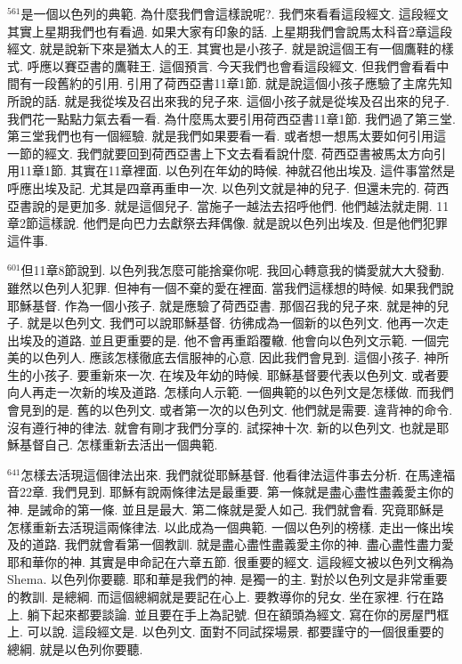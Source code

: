 \documentclass{book}
\begin{document}
$^{561}$是一個以色列的典範.
為什麼我們會這樣說呢?.
我們來看看這段經文.
這段經文其實上星期我們也有看過.
如果大家有印象的話.
上星期我們會說馬太科音2章這段經文.
就是說新下來是猶太人的王.
其實也是小孩子.
就是說這個王有一個鷹鞋的樣式.
呼應以賽亞書的鷹鞋王.
這個預言.
今天我們也會看這段經文.
但我們會看看中間有一段舊約的引用.
引用了荷西亞書11章1節.
就是說這個小孩子應驗了主席先知所說的話.
就是我從埃及召出來我的兒子來.
這個小孩子就是從埃及召出來的兒子.
我們花一點點力氣去看一看.
為什麼馬太要引用荷西亞書11章1節.
我們過了第三堂.
第三堂我們也有一個經驗.
就是我們如果要看一看.
或者想一想馬太要如何引用這一節的經文.
我們就要回到荷西亞書上下文去看看說什麼.
荷西亞書被馬太方向引用11章1節.
其實在11章裡面.
以色列在年幼的時候.
神就召他出埃及.
這件事當然是呼應出埃及記.
尤其是四章再重申一次.
以色列文就是神的兒子.
但還未完的.
荷西亞書說的是更加多.
就是這個兒子.
當施子一越法去招呼他們.
他們越法就走開.
11章2節這樣說.
他們是向巴力去獻祭去拜偶像.
就是說以色列出埃及.
但是他們犯罪這件事.

$^{601}$但11章8節說到.
以色列我怎麼可能捨棄你呢.
我回心轉意我的憐愛就大大發動.
雖然以色列人犯罪.
但神有一個不棄的愛在裡面.
當我們這樣想的時候.
如果我們說耶穌基督.
作為一個小孩子.
就是應驗了荷西亞書.
那個召我的兒子來.
就是神的兒子.
就是以色列文.
我們可以說耶穌基督.
彷彿成為一個新的以色列文.
他再一次走出埃及的道路.
並且更重要的是.
他不會再重蹈覆轍.
他會向以色列文示範.
一個完美的以色列人.
應該怎樣徹底去信服神的心意.
因此我們會見到.
這個小孩子.
神所生的小孩子.
要重新來一次.
在埃及年幼的時候.
耶穌基督要代表以色列文.
或者要向人再走一次新的埃及道路.
怎樣向人示範.
一個典範的以色列文是怎樣做.
而我們會見到的是.
舊的以色列文.
或者第一次的以色列文.
他們就是需要.
違背神的命令.
沒有遵行神的律法.
就會有剛才我們分享的.
試探神十次.
新的以色列文.
也就是耶穌基督自己.
怎樣重新去活出一個典範.

$^{641}$怎樣去活現這個律法出來.
我們就從耶穌基督.
他看律法這件事去分析.
在馬達福音22章.
我們見到.
耶穌有說兩條律法是最重要.
第一條就是盡心盡性盡義愛主你的神.
是誡命的第一條.
並且是最大.
第二條就是愛人如己.
我們就會看.
究竟耶穌是怎樣重新去活現這兩條律法.
以此成為一個典範.
一個以色列的榜樣.
走出一條出埃及的道路.
我們就會看第一個教訓.
就是盡心盡性盡義愛主你的神.
盡心盡性盡力愛耶和華你的神.
其實是申命記在六章五節.
很重要的經文.
這段經文被以色列文稱為Shema.
以色列你要聽.
耶和華是我們的神.
是獨一的主.
對於以色列文是非常重要的教訓.
是總綱.
而這個總綱就是要記在心上.
要教導你的兒女.
坐在家裡.
行在路上.
躺下起來都要談論.
並且要在手上為記號.
但在額頭為經文.
寫在你的房屋門框上.
可以說.
這段經文是.
以色列文.
面對不同試探場景.
都要謹守的一個很重要的總綱.
就是以色列你要聽.
\end{document}
